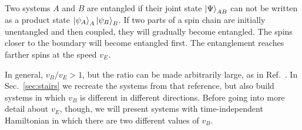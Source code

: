 Two systems $A$ and $B$ are entangled if their joint state $\left|\Psi\right\rangle_{AB}$ can not be written as a product state $\left|\psi_A\right\rangle_A\left|\psi_B\right\rangle_B$. If two parts of a spin chain are initially unentangled and then coupled, they will gradually become entangled. The spins closer to the boundary will become entangled first. The entanglement reaches farther spins at the speed $v_E$.

In general, $v_B/v_E>1$, but the ratio can be made arbitrarily large, as in Ref.~\cite{Nahum2018}. In Sec.~\ref{sec:stairs} we recreate the systems from that reference, but also build systems in which $v_B$ is different in different directions. Before going into more detail about $v_E$, though, we will present systems with time-independent Hamiltonian in which there are two different values of $v_B$.